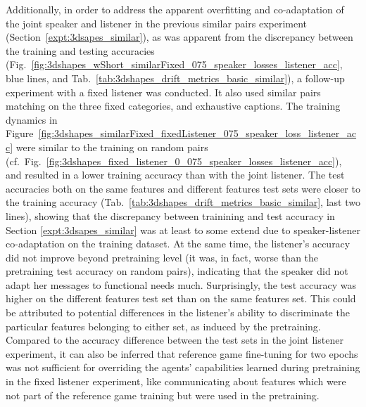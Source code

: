 Additionally, in order to address the apparent overfitting and co-adaptation of the joint speaker and listener in the previous similar pairs experiment (Section~\ref{expt:3dsapes_similar}), as was apparent from the discrepancy between the training and testing accuracies (Fig.~\ref{fig:3dshapes_wShort_similarFixed_075_speaker_losses_listener_acc}, blue lines, and Tab.~\ref{tab:3dshapes_drift_metrics_basic_similar}), a follow-up experiment with a fixed listener was conducted. It also used similar pairs matching on the three fixed categories, and exhaustive captions. 
The training dynamics in Figure~\ref{fig:3dshapes_similarFixed_fixedListener_075_speaker_loss_listener_acc} were similar to the training on random pairs (cf.~Fig.~\ref{fig:3dshapes_fixed_listener_0_075_speaker_losses_listener_acc}), and resulted in a lower training accuracy than with the joint listener. The test accuracies both on the same features and different features test sets were closer to the training accuracy (Tab.~\ref{tab:3dshapes_drift_metrics_basic_similar}, last two lines), showing that the discrepancy between trainining and test accuracy in Section \ref{expt:3dsapes_similar} was at least to some extend due to speaker-listener co-adaptation on the training dataset. At the same time, the listener's accuracy did not improve beyond pretraining level (it was, in fact, worse than the pretraining test accuracy on random pairs), indicating that the speaker did not adapt her messages to functional needs much. Surprisingly, the test accuracy was higher on the different features test set than on the same features set. This could be attributed to potential differences in the listener's ability to discriminate the particular features belonging to either set, as induced by the pretraining. Compared to the accuracy difference between the test sets in the joint listener experiment, it can also be inferred that reference game fine-tuning for two epochs was not sufficient for overriding the agents' capabilities learned during pretraining in the fixed listener experiment, like communicating about features which were not part of the reference game training but were used in the pretraining.

